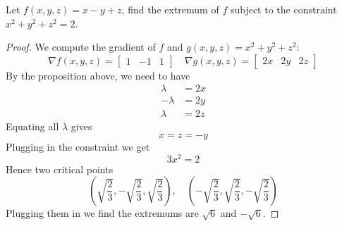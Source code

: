 \documentclass[openany]{book}
\begin{document}
\begin{prob}
Let $f(x,y,z)=x-y+z$, find the extremum of $f$ subject to the constraint $x^2+y^2+z^2=2$.
\end{prob}
\begin{proof}
    We compute the gradient of $f$ and $g(x,y,z)=x^2+y^2+z^2$:
    \begin{equation*}
        \nabla f(x,y,z)=\begin{bmatrix}
            1&-1&1
        \end{bmatrix}\quad \nabla g(x,y,z)=\begin{bmatrix}
            2x&2y&2z
        \end{bmatrix}
    \end{equation*}
    By the proposition above, we need to have 
    \begin{align*}
        \lambda&=2x\\
        -\lambda&=2y\\
        \lambda&=2z
    \end{align*}
    Equating all $\lambda$ gives 
    \begin{equation*}
        x=z=-y
    \end{equation*}
    Plugging in the constraint we get 
    \begin{equation*}
        3x^2=2
    \end{equation*}
    Hence two critical points 
    \begin{equation*}
        \left(\sqrt{\frac{2}{3}}, -\sqrt{\frac{2}{3}}, \sqrt{\frac{2}{3}}\right), \quad \left(-\sqrt{\frac{2}{3}}, \sqrt{\frac{2}{3}}, -\sqrt{\frac{2}{3}}\right)
    \end{equation*}
    Plugging them in we find the extremums are $\sqrt{6}$ and $-\sqrt{6}$.
\end{proof}
\end{document}
